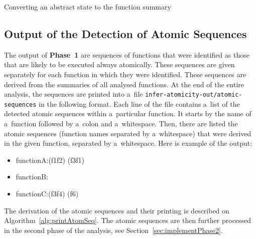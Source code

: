 \begin{algorithm}[hbt]


    \caption{Converting an abstract state to the function summary}
    \label{alg:phase1AstateToSum}
\end{algorithm}


\subsection{Output of the Detection of Atomic Sequences}
\label{sec:implementPhase1Out}

The output of \textbf{Phase~1} are sequences of functions that were 
identified as those that are likely to be executed always atomically. 
These sequences are given separately for each function in which they were
identified. These sequences are derived from the summaries of all analysed
functions. At the end of the entire analysis, the sequences are printed 
into a~file \texttt{infer-atomicity-out/atomic-sequences} in the 
following format. Each line of the file contains a~list of the detected 
atomic sequences within a~particular function. It starts by the name of
a~function followed by a~colon and a~whitespace. Then, there are listed the
atomic sequences (function names separated by a~whitespace) that were 
derived in the given function, separated by a~whitespace. Here is example 
of the output:
\begin{samepage}
    \begin{itemize}[label=]
        \tt
        \setlength\itemsep{0em}

        \item
            functionA:{\textvisiblespace}(f1{\textvisiblespace}f2)%
            {\textvisiblespace}(f3{\textvisiblespace}f1)

        \item
            functionB:{\textvisiblespace}

        \item
            functionC:{\textvisiblespace}(f3{\textvisiblespace}f4)%
            {\textvisiblespace}(f6)
    \end{itemize}
\end{samepage}
The derivation of the atomic sequences and their printing is described on
Algorithm~\ref{alg:printAtomSeq}. The atomic sequences are then further
processed in the second phase of the analysis, see
Section~\ref{sec:implementPhase2}.

